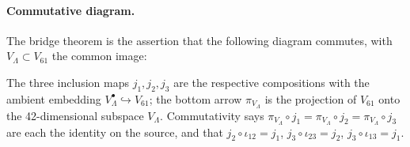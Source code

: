 \documentclass[11pt]{article}
\theoremstyle{plain}
\theoremstyle{definition}
\theoremstyle{remark}
\begin{document}
\paragraph{Commutative diagram.}  The bridge theorem is the assertion that the following diagram commutes, with $V_\Lambda \subset V_{61}$ the common image:
\begin{center}
\end{center}
The three inclusion maps $j_1, j_2, j_3$ are the respective compositions with the ambient embedding $V_\Lambda^{\bullet} \hookrightarrow V_{61}$; the bottom arrow $\pi_{V_\Lambda}$ is the projection of $V_{61}$ onto the 42-dimensional subspace $V_\Lambda$.  Commutativity says $\pi_{V_\Lambda} \circ j_1 = \pi_{V_\Lambda} \circ j_2 = \pi_{V_\Lambda} \circ j_3$ are each the identity on the source, and that $j_2 \circ \iota_{12} = j_1$, $j_3 \circ \iota_{23} = j_2$, $j_3 \circ \iota_{13} = j_1$.
\end{document}
